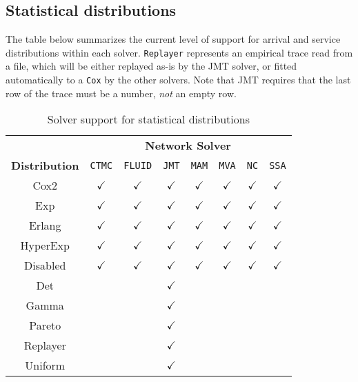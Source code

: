 \subsection{Statistical distributions}
The table below summarizes the current level of support for arrival and service distributions within each solver. \texttt{Replayer} represents an empirical trace read from a file, which will be either replayed as-is by the JMT solver, or fitted automatically to a \texttt{Cox} by the other solvers. Note that JMT requires that the last row of the trace must be a number, {\em not} an empty row.

\begin{table}[h!]
\renewcommand{\arraystretch}{1.2}
\centering
\caption{Solver support for statistical distributions}
\begin{tabular}{|c|c|c|c|c|c|c|c|}
\cline{2-8}
\multicolumn{1}{c|}{}&\multicolumn{7}{c|}{\textbf{Network Solver}}\\
\cline{1-8}
\textbf{Distribution}	&\texttt{CTMC}&\texttt{FLUID} 	&\texttt{JMT} 	&\texttt{MAM}	&\texttt{MVA}	&\texttt{NC}	&\texttt{SSA}	\\
\hline
Cox2	&$\checkmark$			&$\checkmark$	&  $\checkmark$	 	&  $\checkmark$	 	& $\checkmark$ &$\checkmark$	&$\checkmark$	   \\
\hline
Exp	&$\checkmark$			&$\checkmark$	&  $\checkmark$	 	&  $\checkmark$	 	& $\checkmark$ & $\checkmark$	&$\checkmark$	   \\
\hline
Erlang	&$\checkmark$			&$\checkmark$	&  $\checkmark$		&  $\checkmark$	   	& $\checkmark$ &$\checkmark$	&$\checkmark$	  \\
\hline
HyperExp	&$\checkmark$			&$\checkmark$	&  $\checkmark$		&  $\checkmark$	  	& $\checkmark$ &$\checkmark$&$\checkmark$		  \\
\hline
Disabled 	&$\checkmark$		&	$\checkmark$&$\checkmark$ 	& $\checkmark$	&	$\checkmark$ & $\checkmark$ &$\checkmark$	\\
\hline
Det 				&	&	& $\checkmark$	&&&&	\\
\hline
Gamma 				&	&	& $\checkmark$	&&&&	\\
\hline
Pareto 			&	& 	& $\checkmark$&	&&&	\\
\hline
Replayer 				& 	& 	&	$\checkmark$ &  &  & 	&	\\
\hline
Uniform 	&	& 	& $\checkmark$&	&&	&\\
\hline
\end{tabular}
\label{TAB_stat_distributions}
\end{table}



